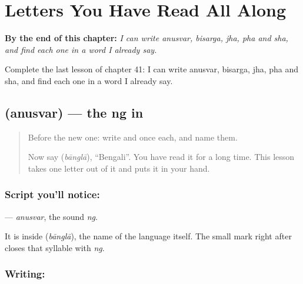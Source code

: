
\chapter{Letters You Have Read All Along}
\label{ch:bn-letters-read-all-along}

\begin{chapteropening}
\textbf{By the end of this chapter:} \emph{I can write anusvar, bisarga, jha, pha and sha, and find each one in a word I already say.}

Complete the last lesson of chapter 41: I can write anusvar, bisarga, jha, pha and sha, and find each one in a word I already say.
\end{chapteropening}

\section[\texorpdfstring{\bn{ং} (anusvar)}{ং (anusvar)}]{ (anusvar) — the ng in }

\label{lesson:BN-W41-anusvar}



\begin{quote}
Before the new one: write  and  once each, and name them.

Now say \textbf{} (\emph{bānglā}), \textquotedblleft{}Bengali\textquotedblright{}. You have read it for a long time. This lesson takes one letter out of it and puts it in your hand.
\end{quote}

\subsection*{Script you'll notice: }
\textbf{} — \emph{anusvar}, the sound \emph{ng}.

It is inside \textbf{} (\emph{bānglā}), the name of the language itself. The small mark right after \textbf{} closes that syllable with \emph{ng}.

\subsection*{Writing: }


